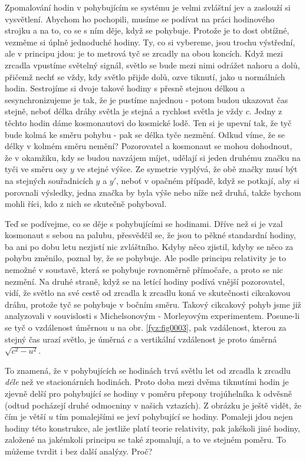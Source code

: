     Zpomalování hodin v pohybujícím se systému je velmi zvláštní jev a zaslouží si vysvětlení. 
    Abychom ho pochopili, musíme se podívat na práci hodinového strojku a na to, co se s ním děje, 
    když se pohybuje. Protože je to dost obtížné, vezměme si úplně jednoduché hodiny. Ty, co si 
    vybereme, jsou trochu výstřední, ale v principu jdou: je to metrová tyč se zrcadly na obou 
    koncích. Když mezi zrcadla vpustíme světelný signál, světlo se bude mezi nimi odrážet nahoru a 
    dolů, přičemž nechť se vždy, kdy světlo přijde dolů, ozve tiknutí, jako u normálních hodin. 
    Sestrojíme si dvoje takové hodiny s přesně stejnou délkou a sesynchronizujeme je tak, že je 
    pustíme najednou - potom budou ukazovat čas stejně, neboť délka dráhy světla je stejná a 
    rychlost světla je vždy \(c\). Jedny z těchto hodin dáme kosmonautovi do kosmické lodě. Ten si 
    je upevní tak, že tyč bude kolmá ke směru pohybu - pak se délka tyče nezmění. Odkud víme, že se 
    délky v kolmém směru nemění? Pozorovatel a kosmonaut se mohou dohodnout, že v okamžiku, kdy se 
    budou navzájem míjet, udělají si jeden druhému značku na tyči ve směru osy \(y\) ve stejné 
    výšce. Ze symetrie vyplývá, že obě značky musí být na stejných souřadnicích \(y\) a \(y'\), 
    neboť v opačném případě, když se potkají, aby si porovnali výsledky, jedna značka by byla výše 
    nebo níže než druhá, takže bychom mohli říci, kdo z nich se skutečně pohyboval.
    
    Teď se podívejme, co se děje s pohybujícími se hodinami. Dříve než si je vzal kosmonaut s sebou 
    na palubu, přesvědčil se, že jsou to pěkné standardní hodiny, ba ani po dobu letu nezjistí nic 
    zvláštního. Kdyby něco zjistil, kdyby se něco za pohybu změnilo, poznal by, že se pohybuje. Ale 
    podle principu relativity je to nemožné v soustavě, která se pohybuje rovnoměrně přímočaře, a 
    proto se nic nezmění. Na druhé straně, když se na letící hodiny podívá vnější pozorovatel, 
    vidí, že světlo na své cestě od zrcadla k zrcadlu koná ve skutečnosti cikcakovou dráhu, protože 
    tyč se pohybuje v bočním směru. Takový cikcakový pohyb jsme již analyzovali v souvislosti s 
    Michelsonovým - Morleyovým experimentem. Posune-li se tyč o vzdálenost úměrnou \(u\) na obr. 
    \ref{fyz:fig0003}, pak vzdálenost, kterou za stejný čas urazí světlo, je úměrná \(c\) a 
    vertikální vzdálenost je proto úměrná \(\sqrt{c^2 - u^2}\).
    
    To znamená, že v pohybujících se hodinách trvá světlu let od zrcadla k zrcadlu \emph{déle} než 
    ve stacionárních hodinách. Proto doba mezi dvěma tiknutími hodin je zjevně delší pro pohybující 
    se hodiny v poměru přepony trojúhelníka k odvěsně (odtud pocházejí druhé odmocniny v našich 
    vztazích). Z obrázku je ještě vidět, že čím je větší \(u\) tím pomalejšími se jeví pohybující 
    se hodiny. Pomaleji jdou nejen hodiny této konstrukce, ale jestliže platí teorie relativity, 
    pak jakékoli jiné hodiny, založené na jakémkoli principu se také zpomalují, a to ve stejném 
    poměru. To můžeme tvrdit i bez další analýzy. Proč?
    
